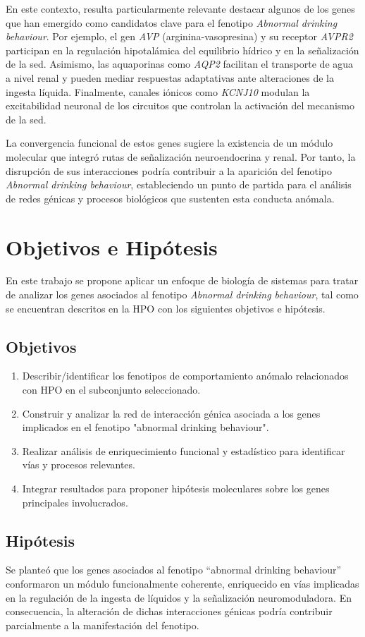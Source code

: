 En este contexto, resulta particularmente relevante destacar algunos de los genes que han emergido como candidatos clave para el fenotipo \textit{Abnormal drinking behaviour}. Por ejemplo, el gen \textit{AVP} (arginina-vasopresina) y su receptor \textit{AVPR2} participan en la regulación hipotalámica del equilibrio hídrico y en la señalización de la sed. Asimismo, las aquaporinas como \textit{AQP2} facilitan el transporte de agua a nivel renal y pueden mediar respuestas adaptativas ante alteraciones de la ingesta líquida. Finalmente, canales iónicos como \textit{KCNJ10} modulan la excitabilidad neuronal de los circuitos que controlan la activación del mecanismo de la sed. 

La convergencia funcional de estos genes sugiere la existencia de un módulo molecular que integró rutas de señalización neuroendocrina y renal. Por tanto, la disrupción de sus interacciones podría contribuir a la aparición del fenotipo \textit{Abnormal drinking behaviour}, estableciendo un punto de partida para el análisis de redes génicas y procesos biológicos que sustenten esta conducta anómala.


\section{Objetivos e Hipótesis}
En este trabajo se propone aplicar un enfoque de biología de sistemas para tratar de analizar los genes asociados al fenotipo \textit{Abnormal drinking behaviour}, tal como se encuentran descritos en la HPO con los siguientes objetivos e hipótesis.
\subsection{Objetivos}
\begin{enumerate}
    \item Describir/identificar los fenotipos de comportamiento anómalo relacionados con HPO en el subconjunto seleccionado.
    \item Construir y analizar la red de interacción génica asociada a los genes implicados en el fenotipo "abnormal drinking behaviour".
    \item Realizar análisis de enriquecimiento funcional y estadístico para identificar vías y procesos relevantes.
    \item Integrar resultados para proponer hipótesis moleculares sobre los genes principales involucrados.
\end{enumerate}

\subsection{Hipótesis}
Se planteó que los genes asociados al fenotipo “abnormal drinking behaviour” conformaron un módulo funcionalmente coherente, enriquecido en vías implicadas en la regulación de la ingesta de líquidos y la señalización neuromoduladora. En consecuencia, la alteración de dichas interacciones génicas podría contribuir parcialmente a la manifestación del fenotipo.